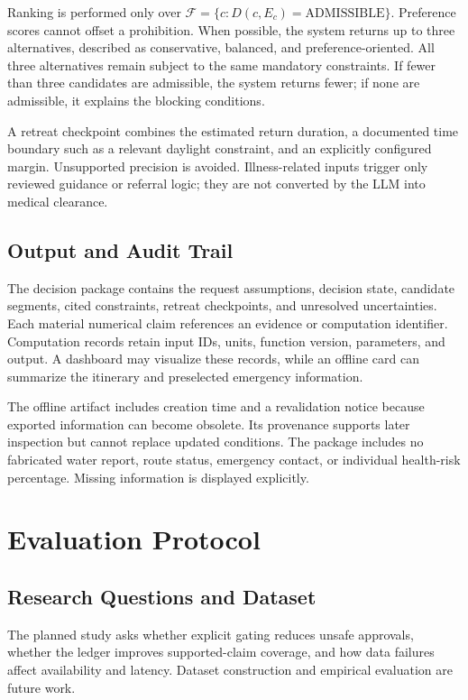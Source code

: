 \documentclass[conference]{IEEEtran}
\begin{document}
Ranking is performed only over $\mathcal F=\{c:D(c,E_c)=\text{ADMISSIBLE}\}$. Preference scores cannot offset a prohibition. When possible, the system returns up to three alternatives, described as conservative, balanced, and preference-oriented. All three alternatives remain subject to the same mandatory constraints. If fewer than three candidates are admissible, the system returns fewer; if none are admissible, it explains the blocking conditions.

A retreat checkpoint combines the estimated return duration, a documented time boundary such as a relevant daylight constraint, and an explicitly configured margin. Unsupported precision is avoided. Illness-related inputs trigger only reviewed guidance or referral logic; they are not converted by the LLM into medical clearance.

\subsection{Output and Audit Trail}
The decision package contains the request assumptions, decision state, candidate segments, cited constraints, retreat checkpoints, and unresolved uncertainties. Each material numerical claim references an evidence or computation identifier. Computation records retain input IDs, units, function version, parameters, and output. A dashboard may visualize these records, while an offline card can summarize the itinerary and preselected emergency information.

The offline artifact includes creation time and a revalidation notice because exported information can become obsolete. Its provenance supports later inspection but cannot replace updated conditions. The package includes no fabricated water report, route status, emergency contact, or individual health-risk percentage. Missing information is displayed explicitly.

\section{Evaluation Protocol}
\subsection{Research Questions and Dataset}
The planned study asks whether explicit gating reduces unsafe approvals, whether the ledger improves supported-claim coverage, and how data failures affect availability and latency. Dataset construction and empirical evaluation are future work.
\end{document}

